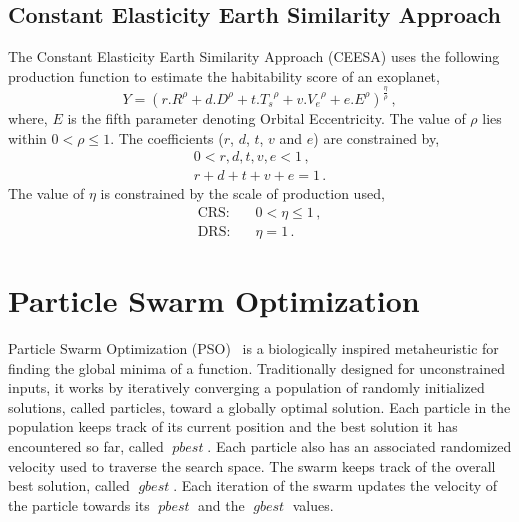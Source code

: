 \documentclass[10pt]{article}
\DeclareMathOperator*{\pbest}{\mathit{pbest}}
\DeclareMathOperator*{\gbest}{\mathit{gbest}}
\begin{document}
\subsection{Constant Elasticity Earth Similarity Approach}\label{subsec:ceesa}
The Constant Elasticity Earth Similarity Approach (CEESA) uses the following production function to estimate the
habitability score of an exoplanet,
\begin{equation}\label{eq:ceesa}
  Y = {(r.R^\rho+d.D^\rho+t.{T_s}^\rho+v.{V_e}^\rho+e.E^\rho)}^{\frac{\eta}{\rho}}\,,
\end{equation}
where, $E$ is the fifth parameter denoting Orbital Eccentricity. The value of $\rho$ lies within $0<\rho\leq 1$.
The coefficients ($r$, $d$, $t$, $v$ and $e$) are constrained by,
\begin{subequations}
  \begin{align}
      0 < r,d,t,v,e < 1\,,\\
      r+d+t+v+e = 1\,.
  \end{align}
\end{subequations}
The value of $\eta$ is constrained by the scale of production used,
\begin{subequations}
  \begin{alignat}{3}
    \text{CRS:} & \quad 0 < \eta \leq 1\,,\\
    \text{DRS:} & \quad \eta = 1\,.
  \end{alignat}
\end{subequations}


\section{Particle Swarm Optimization}\label{sec:pso}

Particle Swarm Optimization (PSO)~\cite{PSO1} is a biologically inspired metaheuristic for finding the global minima of
a function.  Traditionally designed for unconstrained inputs, it works by iteratively converging a population of
randomly initialized solutions, called particles, toward a globally optimal solution. Each particle in the population
keeps track of its current position and the best solution it has encountered so far, called $\pbest$. Each particle also
has an associated randomized velocity used to traverse the search space. The swarm keeps track of the overall best
solution, called $\gbest$. Each iteration of the swarm updates the velocity of the particle towards its $\pbest$ and the
$\gbest$ values.
\end{document}
